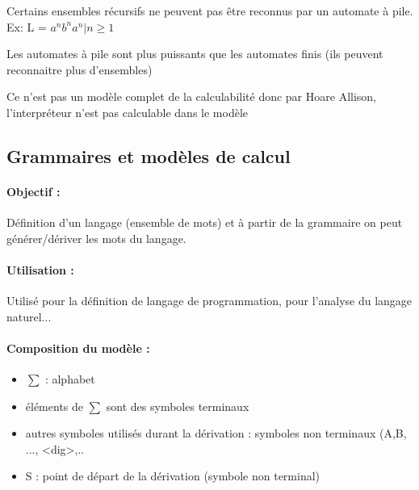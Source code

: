 \begin{myprop}
	Certains ensembles récursifs ne peuvent pas être reconnus par un automate 
	à pile. Ex: L = ${a^n b^n a^n | n\geq 1}$
\end{myprop}

\begin{myprop}
	Les automates à pile sont plus puissants que les automates finis (ils 
	peuvent reconnaitre plus d'ensembles)
\end{myprop}

\begin{myprop}
	Ce n'est pas un modèle complet de la calculabilité donc par Hoare 
	Allison, l'interpréteur n'est pas calculable dans le modèle
\end{myprop}


\subsection{Grammaires et modèles de calcul}
\label{sub:grammaires_et_mod_les_de_calcul}

\paragraph{Objectif :}
Définition d'un langage (ensemble de mots) et à partir de la grammaire on peut 
générer/dériver les mots du langage.

\paragraph{Utilisation :} Utilisé pour la définition de langage de 
programmation, pour l'analyse du langage naturel...

\paragraph{Composition du modèle :}

\begin{itemize}
	\item $\sum$ : alphabet
	\item éléments de $\sum$ sont des symboles terminaux
	\item autres symboles utilisés durant la dérivation : symboles non 
		terminaux (A,B, ..., <dig>,..
	\item S : point de départ de la dérivation (symbole non terminal)
\end{itemize}

